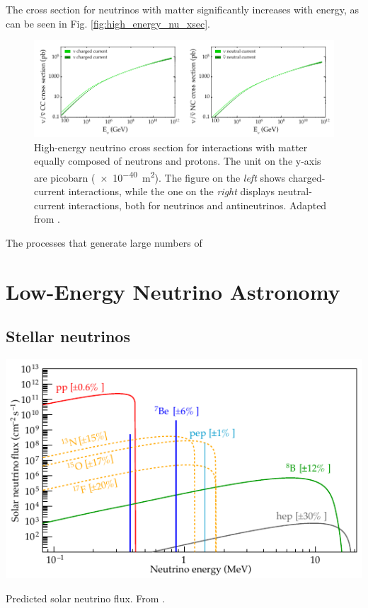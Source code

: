 \documentclass[
    a4paper, %
    fontsize=10pt, %
    twoside=false, %
    numbers=noenddot, %
    fontmethod=tex,
]{kaobook}
\begin{document}
The cross section for neutrinos with matter significantly increases with energy, as can be seen in Fig. \ref{fig:high_energy_nu_xsec}.
\begin{figure}[htb]
    \includegraphics{theory/high_energy_nu_xsec.pdf}
    \caption[High-energy neutrino cross section]{High-energy neutrino cross section for interactions with matter equally composed of neutrons and protons. The unit on the y-axis are picobarn (\SI{e-40}{\m\squared}). The figure on the \textit{left} shows charged-current interactions, while the one on the \textit{right} displays neutral-current interactions, both for neutrinos and antineutrinos. Adapted from \cite{CooperSarkar2011}.}
\end{figure}

The processes that generate large numbers of 

\section{Low-Energy Neutrino Astronomy}

\subsection{Stellar neutrinos}
\begin{marginfigure}
    \includegraphics{theory/solar_neutrinos.pdf}
    \caption[Predicted solar neutrino flux]{Predicted solar neutrino flux. From \cite{Agostini2018}.}
\end{marginfigure}
\end{document}
